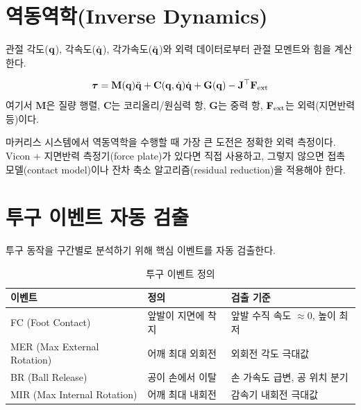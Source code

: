 \documentclass[11pt, a4paper]{report}
\begin{document}
\section{역동역학(Inverse Dynamics)}

관절 각도($\mathbf{q}$), 각속도($\dot{\mathbf{q}}$), 각가속도($\ddot{\mathbf{q}}$)와 외력 데이터로부터
관절 모멘트와 힘을 계산한다.

\begin{equation}
  \bm{\tau} = \mathbf{M}(\mathbf{q})\ddot{\mathbf{q}} + \mathbf{C}(\mathbf{q}, \dot{\mathbf{q}})\dot{\mathbf{q}} + \mathbf{G}(\mathbf{q}) - \mathbf{J}^\top \mathbf{F}_{\text{ext}}
\end{equation}
여기서 $\mathbf{M}$은 질량 행렬, $\mathbf{C}$는 코리올리/원심력 항,
$\mathbf{G}$는 중력 항, $\mathbf{F}_{\text{ext}}$는 외력(지면반력 등)이다.

\begin{importantnote}
마커리스 시스템에서 역동역학을 수행할 때 가장 큰 도전은 정확한 외력 측정이다.
Vicon + 지면반력 측정기(force plate)가 있다면 직접 사용하고,
그렇지 않으면 접촉 모델(contact model)이나 잔차 축소 알고리즘(residual reduction)을
적용해야 한다.
\end{importantnote}

\section{투구 이벤트 자동 검출}

투구 동작을 구간별로 분석하기 위해 핵심 이벤트를 자동 검출한다.

\begin{table}[H]
\centering
\caption{투구 이벤트 정의}
\begin{tabularx}{\textwidth}{lXl}
\toprule
\textbf{이벤트} & \textbf{정의} & \textbf{검출 기준} \\
\midrule
FC (Foot Contact) & 앞발이 지면에 착지 & 앞발 수직 속도 $\approx 0$, 높이 최저 \\
MER (Max External Rotation) & 어깨 최대 외회전 & 외회전 각도 극대값 \\
BR (Ball Release) & 공이 손에서 이탈 & 손 가속도 급변, 공 위치 분기 \\
MIR (Max Internal Rotation) & 어깨 최대 내회전 & 감속기 내회전 극대값 \\
\bottomrule
\end{tabularx}
\end{table}
\end{document}
